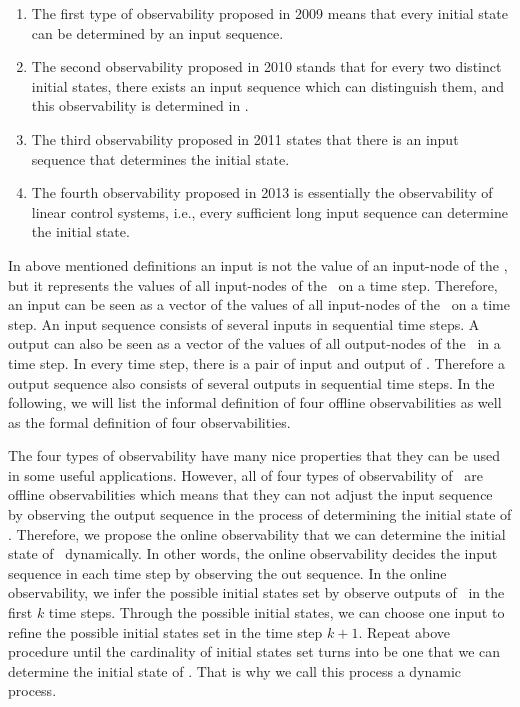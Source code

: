 \begin{enumerate}
	\item The first type of observability proposed in 2009 \cite{cheng2009controllability} means that every initial state can be determined by an input sequence.
	
	\item 
	The second observability proposed in 2010 \cite{Zhao2010Input} stands that for every two distinct initial states, there exists an input sequence which can distinguish them, and this observability is determined in \cite{Li2015Controllability}.
	
	\item The third observability proposed in 2011 \cite{Cheng2011Identification} states that there is an input sequence that determines the initial state.
	
	\item  The fourth observability proposed in 2013 \cite{Fornasini2013Observability} is essentially the observability of linear control systems, i.e., every sufficient long input sequence can determine the initial state.
\end{enumerate}
 



In above mentioned definitions an input is not the value of an input-node of the \BCN, but it represents the values of all input-nodes of the \BCN\ on a time step. Therefore, an input can be seen as a vector of the values of all input-nodes of the \BCN\ on a time step. An input sequence consists of several inputs in sequential time steps.
     A output can also be seen as a vector of the values of all output-nodes of the \BCN\ in a time step. In every time step, there is a pair of input and output of \BCN. Therefore a output sequence also consists of several outputs in sequential time steps. In the following, we will list the informal definition of four offline  observabilities as well as the formal definition of four observabilities.%
 
The four  types of observability  have many nice properties that they can be used in some useful applications. However, all of four  types of observability of \BCNs\ are offline observabilities which means that they can not adjust the input sequence by observing the output sequence in the process of determining the initial state of \BCNs. Therefore, we propose the online observability that we can determine the initial state of \BCNs\ dynamically. In other words,  the online observability decides the input sequence in each time step by observing the out sequence. In the  online observability, we infer the possible  initial states set by observe outputs of \BCN\ in the first $k$ time steps. Through the  possible  initial states, we can choose one input to refine the possible initial states set in the time step $k+1$. Repeat above procedure until the cardinality of initial states set turns into be one that we can determine the initial state of \BCNs. That is why we call this process a dynamic process. 

